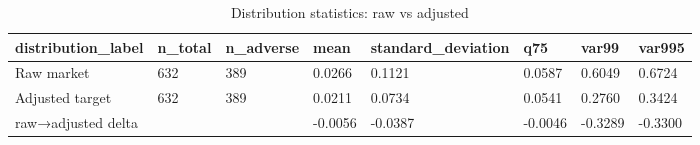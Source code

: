 \begin{table}[htbp]
\centering
\caption{Distribution statistics: raw vs adjusted}
\label{tab:v1_dist_stats}
\begin{tabular}{llllllll}
\toprule
\textbf{distribution_label} & \textbf{n_total} & \textbf{n_adverse} & \textbf{mean} & \textbf{standard_deviation} & \textbf{q75} & \textbf{var99} & \textbf{var995} \\
\midrule
Raw market & 632 & 389 & 0.0266 & 0.1121 & 0.0587 & 0.6049 & 0.6724 \\
Adjusted target & 632 & 389 & 0.0211 & 0.0734 & 0.0541 & 0.2760 & 0.3424 \\
raw→adjusted delta &  &  & -0.0056 & -0.0387 & -0.0046 & -0.3289 & -0.3300 \\
\bottomrule
\end{tabular}
\end{table}
